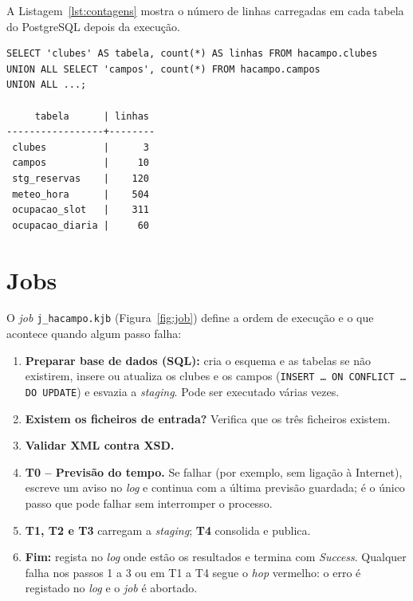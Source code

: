 \documentclass[11pt,a4paper]{article}
\begin{document}
A Listagem~\ref{lst:contagens} mostra o número de linhas carregadas em cada tabela do PostgreSQL depois da execução.

\begin{lstlisting}[language={}, caption={Linhas por tabela no esquema \texttt{hacampo} após a execução do \textit{job}.}, label={lst:contagens}]
SELECT 'clubes' AS tabela, count(*) AS linhas FROM hacampo.clubes
UNION ALL SELECT 'campos', count(*) FROM hacampo.campos
UNION ALL ...;

     tabela      | linhas
-----------------+--------
 clubes          |      3
 campos          |     10
 stg_reservas    |    120
 meteo_hora      |    504
 ocupacao_slot   |    311
 ocupacao_diaria |     60
\end{lstlisting}

\section{Jobs}



O \textit{job} \texttt{j\_hacampo.kjb} (Figura~\ref{fig:job}) define a ordem de execução e o que acontece quando algum passo falha:
\begin{enumerate}[itemsep=2pt]
    \item \textbf{Preparar base de dados (SQL):} cria o esquema e as tabelas se não existirem, insere ou atualiza os clubes e os campos (\texttt{INSERT \ldots{} ON CONFLICT \ldots{} DO UPDATE}) e esvazia a \textit{staging}. Pode ser executado várias vezes.
    \item \textbf{Existem os ficheiros de entrada?} Verifica que os três ficheiros existem.
    \item \textbf{Validar XML contra XSD.}
    \item \textbf{T0 -- Previsão do tempo.} Se falhar (por exemplo, sem ligação à Internet), escreve um aviso no \textit{log} e continua com a última previsão guardada; é o único passo que pode falhar sem interromper o processo.
    \item \textbf{T1, T2 e T3} carregam a \textit{staging}; \textbf{T4} consolida e publica.
    \item \textbf{Fim:} regista no \textit{log} onde estão os resultados e termina com \textit{Success}. Qualquer falha nos passos 1 a 3 ou em T1 a T4 segue o \textit{hop} vermelho: o erro é registado no \textit{log} e o \textit{job} é abortado.
\end{enumerate}
\end{document}
